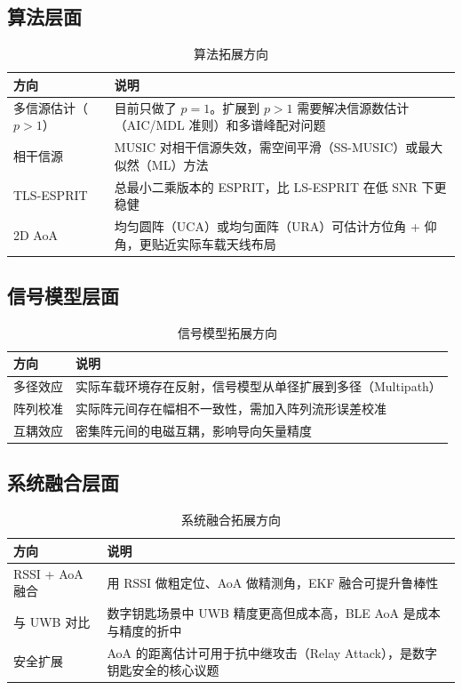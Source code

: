 \documentclass[11pt,a4paper]{article}
\begin{document}
\subsection{算法层面}

\begin{table}[H]
\centering
\caption{算法拓展方向}
\small
\begin{tabular}{lp{8.5cm}}
\toprule
\textbf{方向} & \textbf{说明} \\
\midrule
多信源估计（$p > 1$） & 目前只做了 $p=1$。扩展到 $p>1$ 需要解决信源数估计（AIC/MDL 准则）和多谱峰配对问题 \\
相干信源 & MUSIC 对相干信源失效，需空间平滑（SS-MUSIC）或最大似然（ML）方法 \\
TLS-ESPRIT & 总最小二乘版本的 ESPRIT，比 LS-ESPRIT 在低 SNR 下更稳健 \\
2D AoA & 均匀圆阵（UCA）或均匀面阵（URA）可估计方位角 + 仰角，更贴近实际车载天线布局 \\
\bottomrule
\end{tabular}
\end{table}

\subsection{信号模型层面}

\begin{table}[H]
\centering
\caption{信号模型拓展方向}
\small
\begin{tabular}{lp{8.5cm}}
\toprule
\textbf{方向} & \textbf{说明} \\
\midrule
多径效应 & 实际车载环境存在反射，信号模型从单径扩展到多径（Multipath） \\
阵列校准 & 实际阵元间存在幅相不一致性，需加入阵列流形误差校准 \\
互耦效应 & 密集阵元间的电磁互耦，影响导向矢量精度 \\
\bottomrule
\end{tabular}
\end{table}

\subsection{系统融合层面}

\begin{table}[H]
\centering
\caption{系统融合拓展方向}
\small
\begin{tabular}{lp{8.5cm}}
\toprule
\textbf{方向} & \textbf{说明} \\
\midrule
RSSI + AoA 融合 & 用 RSSI 做粗定位、AoA 做精测角，EKF 融合可提升鲁棒性 \\
与 UWB 对比 & 数字钥匙场景中 UWB 精度更高但成本高，BLE AoA 是成本与精度的折中 \\
安全扩展 & AoA 的距离估计可用于抗中继攻击（Relay Attack），是数字钥匙安全的核心议题 \\
\bottomrule
\end{tabular}
\end{table}
\end{document}
